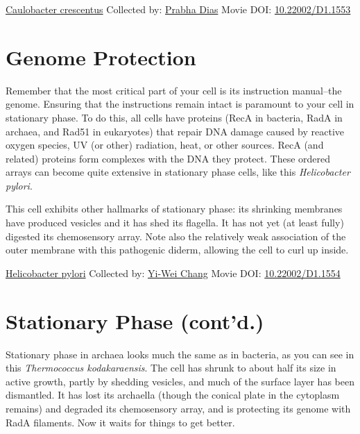 \documentclass[]{tufte-book}
\begin{document}
\hypertarget{htmlwidget-8fef3c14512c17f3b002}{}

\label{fig:8-1}\protect\hyperlink{tree}{Caulobacter crescentus} Collected by: \protect\hyperlink{prabha_dias}{Prabha Dias} Movie DOI: \href{https://doi.org/10.22002/D1.1553}{10.22002/D1.1553}

\hypertarget{genome-protection}{%
\section{Genome Protection}\label{genome-protection}}

Remember that the most critical part of your cell is its instruction manual--the genome. Ensuring that the instructions remain intact is paramount to your cell in stationary phase. To do this, all cells have proteins (RecA in bacteria, RadA in archaea, and Rad51 in eukaryotes) that repair DNA damage caused by reactive oxygen species, UV (or other) radiation, heat, or other sources. RecA (and related) proteins form complexes with the DNA they protect. These ordered arrays can become quite extensive in stationary phase cells, like this \emph{Helicobacter pylori}.

This cell exhibits other hallmarks of stationary phase: its shrinking membranes have produced vesicles and it has shed its flagella. It has not yet (at least fully) digested its chemosensory array. Note also the relatively weak association of the outer membrane with this pathogenic diderm, allowing the cell to curl up inside.



\hypertarget{htmlwidget-28715de25066028e71ec}{}

\label{fig:8-2}\protect\hyperlink{tree}{Helicobacter pylori} Collected by: \protect\hyperlink{yi-wei_chang}{Yi-Wei Chang} Movie DOI: \href{https://doi.org/10.22002/D1.1554}{10.22002/D1.1554}

\hypertarget{stationary-phase-contd.}{%
\section{Stationary Phase (cont'd.)}\label{stationary-phase-contd.}}

Stationary phase in archaea looks much the same as in bacteria, as you can see in this \emph{Thermococcus kodakaraensis}. The cell has shrunk to about half its size in active growth, partly by shedding vesicles, and much of the surface layer has been dismantled. It has lost its archaella (though the conical plate in the cytoplasm remains) and degraded its chemosensory array, and is protecting its genome with RadA filaments. Now it waits for things to get better.
\end{document}
